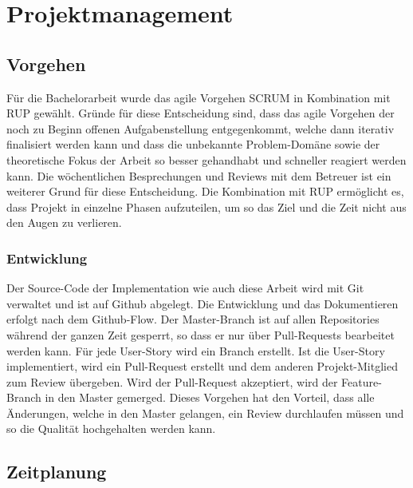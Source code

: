 
\section{Projektmanagement}
\label{Projektmanagement}

\subsection{Vorgehen}
\label{Projektmanagement:Vorgehen}

Für die Bachelorarbeit wurde das agile Vorgehen SCRUM in Kombination mit \ac{RUP} gewählt. Gründe für diese Entscheidung sind, dass das agile Vorgehen der noch zu Beginn offenen Aufgabenstellung entgegenkommt, welche dann iterativ finalisiert werden kann und dass die unbekannte Problem-Domäne sowie der theoretische Fokus der Arbeit so besser gehandhabt und schneller reagiert werden kann. Die wöchentlichen Besprechungen und Reviews mit dem Betreuer ist ein weiterer Grund für diese Entscheidung. Die Kombination mit \ac{RUP} ermöglicht es, dass Projekt in einzelne Phasen aufzuteilen, um so das Ziel und die Zeit nicht aus den Augen zu verlieren.


\subsubsection{Entwicklung}
\label{Vorgehen:Entwicklung}

Der Source-Code der Implementation wie auch diese Arbeit wird mit Git verwaltet und ist auf Github abgelegt. Die Entwicklung und das Dokumentieren erfolgt nach dem Github-Flow. Der Master-Branch ist auf allen Repositories während der ganzen Zeit gesperrt, so dass er nur über Pull-Requests bearbeitet werden kann. Für jede User-Story wird ein Branch erstellt. Ist die User-Story implementiert, wird ein Pull-Request erstellt und dem anderen Projekt-Mitglied zum Review übergeben. Wird der Pull-Request akzeptiert, wird der Feature-Branch in den Master gemerged. Dieses Vorgehen hat den Vorteil, dass alle Änderungen, welche in den Master gelangen, ein Review durchlaufen müssen und so die Qualität hochgehalten werden kann.


\subsection{Zeitplanung}
\label{Projektmanagement:Zeitplanung}

